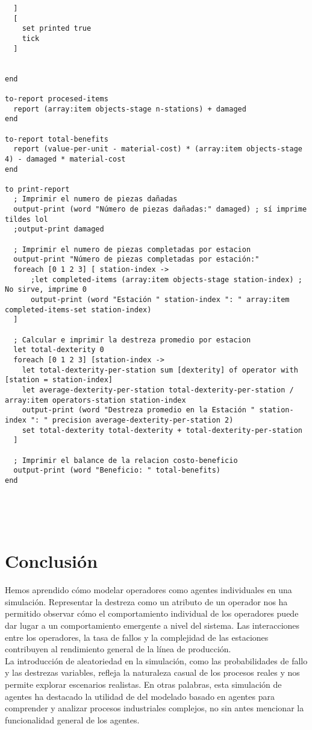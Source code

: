 \documentclass[11pt]{article}
\begin{document}
\begin{verbatim}
  ]
  [
    set printed true
    tick
  ]


end

to-report procesed-items
  report (array:item objects-stage n-stations) + damaged
end

to-report total-benefits
  report (value-per-unit - material-cost) * (array:item objects-stage 4) - damaged * material-cost
end

to print-report
  ; Imprimir el numero de piezas dañadas
  output-print (word "Número de piezas dañadas:" damaged) ; sí imprime tildes lol
  ;output-print damaged

  ; Imprimir el numero de piezas completadas por estacion
  output-print "Número de piezas completadas por estación:"
  foreach [0 1 2 3] [ station-index ->
      ;let completed-items (array:item objects-stage station-index) ; No sirve, imprime 0
      output-print (word "Estación " station-index ": " array:item completed-items-set station-index)
  ]

  ; Calcular e imprimir la destreza promedio por estacion
  let total-dexterity 0
  foreach [0 1 2 3] [station-index ->
    let total-dexterity-per-station sum [dexterity] of operator with [station = station-index]
    let average-dexterity-per-station total-dexterity-per-station / array:item operators-station station-index
    output-print (word "Destreza promedio en la Estación " station-index ": " precision average-dexterity-per-station 2)
    set total-dexterity total-dexterity + total-dexterity-per-station
  ]

  ; Imprimir el balance de la relacion costo-beneficio
  output-print (word "Beneficio: " total-benefits)
end





\end{verbatim}

\pagebreak

\section{Conclusión}
\label{sec:orgf2c9b3b}
Hemos aprendido cómo modelar operadores como agentes individuales en una simulación. Representar la destreza como un atributo de un operador nos ha permitido observar cómo el comportamiento individual de los operadores puede dar lugar a un comportamiento emergente a nivel del sistema. Las interacciones entre los operadores, la tasa de fallos y la complejidad de las estaciones contribuyen al rendimiento general de la línea de producción. \\

La introducción de aleatoriedad en la simulación, como las probabilidades de fallo y las destrezas variables, refleja la naturaleza casual de los procesos reales y nos permite explorar escenarios realistas. En otras palabras, esta simulación de agentes ha destacado la utilidad de del modelado basado en agentes para comprender y analizar procesos industriales complejos, no sin antes mencionar la funcionalidad general de los agentes.
\end{document}
